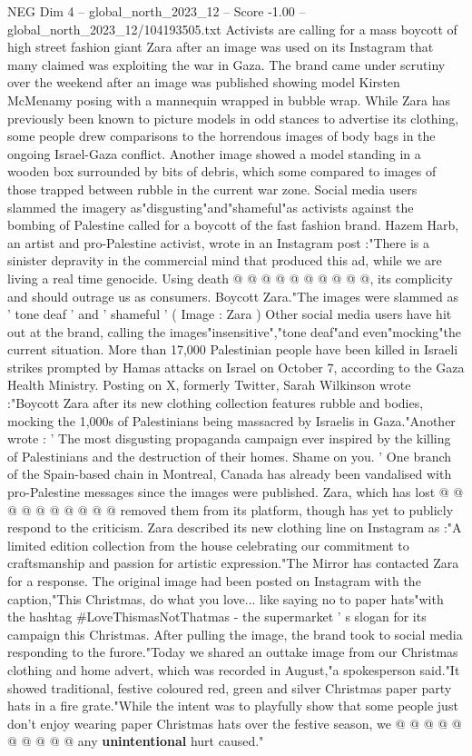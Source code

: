 \begin{textsample}{NEG Dim 4 – global\_north\_2023\_12 – Score -1.00 – global\_north\_2023\_12/104193505.txt}  \label{ex:f4_neg_141}
Activists are calling for a mass boycott of high street fashion giant Zara after an image was used on its Instagram that many claimed was exploiting the war in Gaza.
The brand came under scrutiny over the weekend after an image was published showing model Kirsten McMenamy posing with a mannequin wrapped in bubble wrap.
While Zara has previously been known to picture models in odd stances to advertise its clothing, some people drew comparisons to the horrendous images of body bags in the ongoing Israel-Gaza conflict.
Another image showed a model standing in a wooden box surrounded by bits of debris, which some compared to images of those trapped between rubble in the current war zone.
Social media users slammed the imagery as"disgusting"and"shameful"as activists against the bombing of Palestine called for a boycott of the fast fashion brand.
Hazem Harb, an artist and pro-Palestine activist, wrote in an Instagram post :"There is a sinister depravity in the commercial mind that produced this ad, while we are living a real time genocide.
Using death @ @ @ @ @ @ @ @ @ @, its complicity and should outrage us as consumers.
Boycott Zara."The images were slammed as ' tone deaf ' and ' shameful ' ( Image : Zara ) Other social media users have hit out at the brand, calling the images"insensitive","tone deaf"and even"mocking"the current situation.
More than 17,000 Palestinian people have been killed in Israeli strikes prompted by Hamas attacks on Israel on October 7, according to the Gaza Health Ministry.
Posting on X, formerly Twitter, Sarah Wilkinson wrote :"Boycott Zara after its new clothing collection features rubble and bodies, mocking the 1,000s of Palestinians being massacred by Israelis in Gaza."Another wrote : ' The most disgusting propaganda campaign ever inspired by the killing of Palestinians and the destruction of their homes.
Shame on you. ' One branch of the Spain-based chain in Montreal, Canada has already been vandalised with pro-Palestine messages since the images were published.
Zara, which has lost @ @ @ @ @ @ @ @ @ @ removed them from its platform, though has yet to publicly respond to the criticism.
Zara described its new clothing line on Instagram as :"A limited edition collection from the house celebrating our commitment to craftsmanship and passion for artistic expression."The Mirror has contacted Zara for a response.
The original image had been posted on Instagram with the caption,"This Christmas, do what you love... like saying no to paper hats"with the hashtag \#LoveThismasNotThatmas - the supermarket ' s slogan for its campaign this Christmas.
After pulling the image, the brand took to social media responding to the furore."Today we shared an outtake image from our Christmas clothing and home advert, which was recorded in August,"a spokesperson said."It showed traditional, festive coloured red, green and silver Christmas paper party hats in a fire grate."While the intent was to playfully show that some people just don't enjoy wearing paper Christmas hats over the festive season, we @ @ @ @ @ @ @ @ @ @ any \textbf{unintentional} hurt caused."

\end{textsample}
